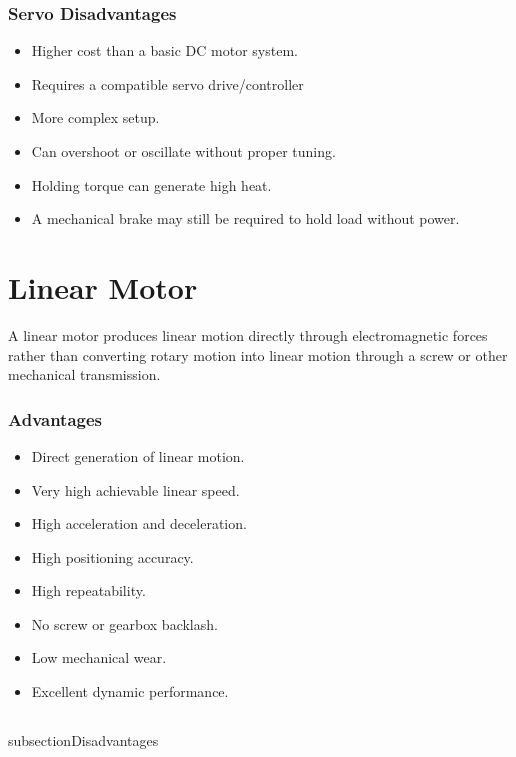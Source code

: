 \documentclass{article}
\begin{document}
\subsubsection{Servo Disadvantages}

\begin{itemize}
    \item Higher cost than a basic DC motor system.
    \item Requires a compatible servo drive/controller 
    \item More complex setup. 
    \item Can overshoot or oscillate without proper tuning. 
    \item Holding torque can generate high heat. 
    \item A mechanical brake may still be required to hold load without power. 
\end{itemize}



\section{Linear Motor}

A linear motor produces linear motion directly through electromagnetic
forces rather than converting rotary motion into linear motion through a
screw or other mechanical transmission.

\subsubsection{Advantages}

\begin{itemize}
    \item Direct generation of linear motion.
    \item Very high achievable linear speed.
    \item High acceleration and deceleration.
    \item High positioning accuracy.
    \item High repeatability.
    \item No screw or gearbox backlash.
    \item Low mechanical wear.
    \item Excellent dynamic performance.
\end{itemize}

\subsection{}subsection{Disadvantages}
\end{document}
